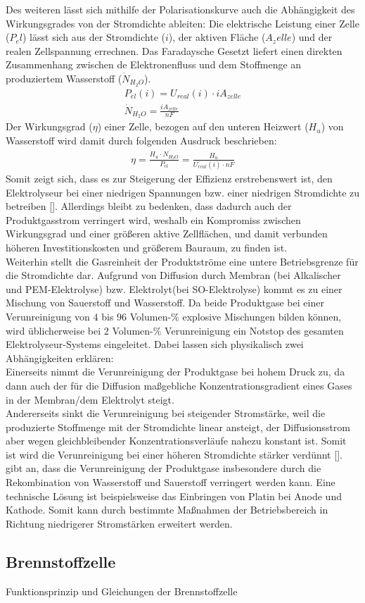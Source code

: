 Des weiteren lässt sich mithilfe der Polarisationskurve auch die Abhängigkeit des Wirkungsgrades von der Stromdichte ableiten: Die elektrische Leistung einer Zelle ($P_el$) lässt sich aus der Stromdichte ($i$), der aktiven Fläche ($A_zelle$) und der realen Zellspannung errechnen. Das Faradaysche Gesetzt liefert einen direkten Zusammenhang zwischen de Elektronenfluss und dem Stoffmenge an produziertem Wasserstoff ($\dot{N}_{H_2O}$).
\begin{align}
	P_{el}(i) = U_{real}(i)\cdot i A_{zelle}\\
	\dot{N}_{H_2O} = \frac{i A_{zelle}}{nF}
\end{align}
Der Wirkungsgrad ($\eta$) einer Zelle, bezogen auf den unteren Heizwert ($H_u$) von Wasserstoff wird damit durch folgenden Ausdruck beschrieben:
\begin{align}
	\eta = \frac{H_u \cdot\dot{N_{H_2O}}}{P_{el}} = \frac{H_u}{U_{real}(i)\cdot{nF}}
\end{align}
Somit zeigt sich, dass es zur Steigerung der Effizienz erstrebenswert ist, den Elektrolyseur bei einer niedrigen Spannungen bzw. einer niedrigen Stromdichte zu betreiben [\cite{A semiempirical study of the temperature dependence of the anode charge transfer coefficient of a 6 kW PEM electrolyzer}]. Allerdings bleibt zu bedenken, dass dadurch auch der Produktgasstrom verringert wird, weshalb ein Kompromiss zwischen Wirkungsgrad und einer größeren aktive Zellflächen, und damit verbunden höheren Investitionskosten und größerem Bauraum, zu finden ist.\\
Weiterhin stellt die Gasreinheit der Produktströme eine untere Betriebsgrenze für die Stromdichte dar. Aufgrund von Diffusion durch Membran (bei Alkalischer und PEM-Elektrolyse) bzw. Elektrolyt(bei SO-Elektrolyse) kommt es zu einer Mischung von Sauerstoff und Wasserstoff. Da beide Produktgase bei einer Verunreinigung von $4$ bis $96$ Volumen-\% explosive Mischungen bilden können, wird üblicherweise bei 2 Volumen-\% Verunreinigung ein Notstop des gesamten Elektrolyseur-Systems eingeleitet.  Dabei lassen sich physikalisch zwei Abhängigkeiten erklären:\\ 
Einerseits nimmt die Verunreinigung der Produktgase bei hohem Druck zu, da dann auch der für die Diffusion maßgebliche Konzentrationsgradient eines Gases in der Membran/dem Elektrolyt steigt.\\
Andererseits sinkt die Verunreinigung bei steigender Stromstärke, weil die produzierte Stoffmenge mit der Stromdichte linear ansteigt, der Diffusionsstrom aber wegen gleichbleibender Konzentrationsverläufe  nahezu konstant ist. Somit ist wird die Verunreinigung bei einer höheren Stromdichte stärker verdünnt [\cite{Alkaline Water Electrolysis Powered by Renewable Energy: A Review}].
\cite{High-pressure PEM water electrolysis and corresponding safety
issues} gibt an, dass die Verunreinigung der Produktgase insbesondere durch die Rekombination von Wasserstoff und Sauerstoff verringert werden kann. Eine technische Lösung ist beispielsweise das Einbringen von Platin bei Anode und Kathode. Somit kann durch bestimmte Maßnahmen der Betriebsbereich in Richtung niedrigerer Stromstärken erweitert werden.
\subsection{Brennstoffzelle}
Funktionsprinzip und Gleichungen der Brennstoffzelle
